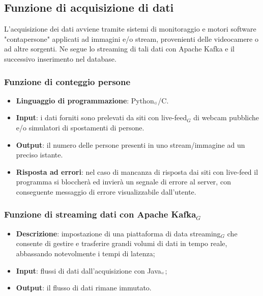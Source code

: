 \subsection{Funzione di acquisizione di dati}\label{DescrizioneGeneraleFunzionalitàDelProdottoFunzioneDiAcquisizioneDiDati}
L'acquisizione dei dati avviene tramite sistemi di monitoraggio e motori software "contapersone" applicati ad immagini e/o stream, provenienti delle videocamere o ad altre sorgenti. Ne segue lo streaming di tali dati con Apache Kafka e il successivo inserimento nel database.

\subsubsection{Funzione di conteggio persone}\label{DescrizioneGeneraleFunzionalitàDelProdottoFunzioneDiAcquisizioneDiDatiFunzioneDiConteggioPersone}
\begin{itemize}
\item \textbf{Linguaggio di programmazione}: Python$_{\scaleto{G}{3pt}}$/C.
\item \textbf{Input}: i dati forniti sono prelevati da siti con live-feed$_G$ di webcam pubbliche e/o simulatori di spostamenti di persone.
\item \textbf{Output}: il numero delle persone presenti in uno stream/immagine ad un preciso istante.
\item \textbf{Risposta ad errori}: nel caso di mancanza di risposta dai siti con live-feed il programma si bloccherà ed invierà un segnale di errore al server, con conseguente messaggio di errore visualizzabile dall'utente.
\end{itemize}

\subsubsection{Funzione di streaming dati con Apache Kafka$_G$}\label{DescrizioneGeneraleFunzionalitàDelProdottoFunzioneDiAcquisizioneDiDatiFunzioneDiStreamingDatiConApacheKafka}

\begin{itemize}
	\item \textbf{Descrizione}: impostazione di una piattaforma di data streaming$_G$ che consente di gestire e trasferire grandi volumi di dati in tempo reale, abbassando notevolmente i tempi di latenza;
	\item \textbf{Input}: flussi di dati dall'acquisizione con Java$_{\scaleto{G}{3pt}}$;
		\item \textbf{Output}: il flusso di dati rimane immutato.
\end{itemize}

